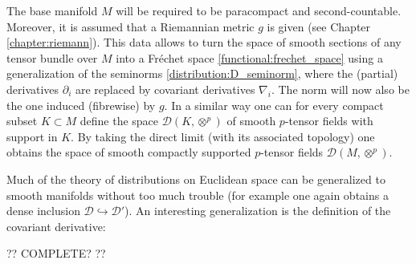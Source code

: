     The base manifold $M$ will be required to be paracompact and second-countable. Moreover, it is assumed that a Riemannian metric $g$ is given (see Chapter \ref{chapter:riemann}). This data allows to turn the space of smooth sections of any tensor bundle over $M$ into a Fr\'echet space \ref{functional:frechet_space} using a generalization of the seminorms \eqref{distribution:D_seminorm}, where the (partial) derivatives $\partial_i$ are replaced by covariant derivatives $\nabla_i$. The norm will now also be the one induced (fibrewise) by $g$. In a similar way one can for every compact subset $K\subset M$ define the space $\mathcal{D}(K,\otimes^p)$ of smooth $p$-tensor fields with support in $K$. By taking the direct limit (with its associated topology) one obtains the space of smooth compactly supported $p$-tensor fields $\mathcal{D}(M,\otimes^p)$.


    Much of the theory of distributions on Euclidean space can be generalized to smooth manifolds without too much trouble (for example one again obtains a dense inclusion $\mathcal{D}\hookrightarrow\mathcal{D}'$). An interesting generalization is the definition of the covariant derivative:

    ?? COMPLETE? ??